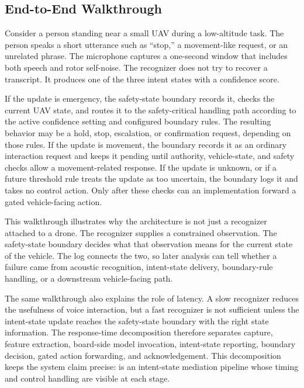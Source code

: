 \subsection{End-to-End Walkthrough}

Consider a person standing near a small UAV during a low-altitude task. The person speaks a short utterance such as ``stop,'' a movement-like request, or an unrelated phrase. The microphone captures a one-second window that includes both speech and rotor self-noise. The recognizer does not try to recover a transcript. It produces one of the three intent states with a confidence score.

If the update is emergency, the safety-state boundary records it, checks the current UAV state, and routes it to the safety-critical handling path according to the active confidence setting and configured boundary rules. The resulting behavior may be a hold, stop, escalation, or confirmation request, depending on those rules. If the update is movement, the boundary records it as an ordinary interaction request and keeps it pending until authority, vehicle-state, and safety checks allow a movement-related response. If the update is unknown, or if a future threshold rule treats the update as too uncertain, the boundary logs it and takes no control action. Only after these checks can an implementation forward a gated vehicle-facing action.

This walkthrough illustrates why the architecture is not just a recognizer attached to a drone. The recognizer supplies a constrained observation. The safety-state boundary decides what that observation means for the current state of the vehicle. The log connects the two, so later analysis can tell whether a failure came from acoustic recognition, intent-state delivery, boundary-rule handling, or a downstream vehicle-facing path.

The same walkthrough also explains the role of latency. A slow recognizer reduces the usefulness of voice interaction, but a fast recognizer is not sufficient unless the intent-state update reaches the safety-state boundary with the right state information. The response-time decomposition therefore separates capture, feature extraction, board-side model invocation, intent-state reporting, boundary decision, gated action forwarding, and acknowledgement. This decomposition keeps the system claim precise: \sys{} is an intent-state mediation pipeline whose timing and control handling are visible at each stage.
